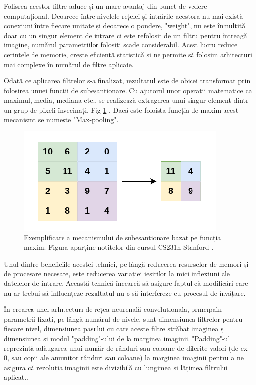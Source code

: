 \documentclass[a4paper,12pt]{book}
\begin{document}
				Folisrea acestor filtre aduce și un mare avantaj din punct de vedere computațional. Deoarece între nivelele rețelei și intrările acestora nu mai există conexiuni între fiecare unitate și deoarece o pondere, "weight", nu este înmulțită doar cu un singur element de intrare ci este refolosit de un filtru pentru întreagă imagine, numărul parametriilor folosiți scade considerabil. Acest lucru reduce cerințele de memorie, crește eficiență statistică și ne permite să folosim arhitecturi mai complexe în numărul de filtre aplicate. \par
				
				Odată ce aplicarea filtrelor s-a finalizat, rezultatul este de obicei transformat prin folosirea unuei funcții de subeșantionare. Cu ajutorul unor operații matematice ca maximul, media, mediana etc., se realizează extragerea unui singur element dintr-un grup de pixeli învecinați, Fig \ref{fig:maxpool} . Dacă este foloista funcția de maxim acest mecanismt se numește "Max-pooling".
				
				\begin{figure}[h]
					\centering
					\includegraphics[scale=0.25]{maxpool}
					\caption{Exemplificare a mecanismului de subeșantionare bazat pe funcția maxim. Figura aparține notitelor din cursul CS231n Stanford \cite{standord_cnn}.}
					\label{fig:maxpool}
				\end{figure}
				
				 \noindent Unul dintre beneficiile acestei tehnici, pe lângă reducerea resurselor de memori și de procesare necesare, este reducerea variației ieșirilor la mici inflexiuni ale datelelor de intrare. Această tehnică încearcă să asigure faptul că modificări care nu ar trebui să influențeze rezultatul nu o să interfereze cu procesul de învățare. \par
				 
				 În crearea unei arhitecturi de rețea neuronală convolutionala, principalii parametrii fixați, pe lângă numărul de nivele, sunt dimensiunea filtrelor pentru fiecare nivel, dimensiunea pasului cu care aceste filtre străbat imaginea și dimensiunea și modul "padding"-ului de la marginea imaginii. "Padding"-ul reprezintă adăugarea unui număr de rânduri sau coloane de diferite valori (de ex 0, sau copii ale anumitor rânduri sau coloane) la marginea imaginii pentru a ne asigura că rezoluția imaginii este divizibilă cu lungimea și lățimea filtrului aplicat..
				
\end{document}
